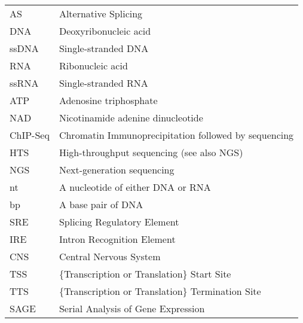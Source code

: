 \documentclass[12pt, letter, oneside]{Thesis} %
\begin{document}
\pagestyle{fancy} 
	\tableofcontents %
	\listoffigures %
	\listoftables %
\clearpage %
	\listAbreviations
\label{hd:abrevs}
\begin{table}[h]
\begin{tabular}{ll}
AS       & Alternative Splicing                                 \\
DNA      & Deoxyribonucleic acid                                \\
ssDNA    & Single-stranded DNA                                  \\
RNA      & Ribonucleic acid                                     \\
ssRNA    & Single-stranded RNA                                  \\
ATP      & Adenosine triphosphate                               \\
NAD      & Nicotinamide adenine dinucleotide                    \\
ChIP-Seq & Chromatin Immunoprecipitation followed by sequencing \\
HTS      & High-throughput sequencing (see also NGS)            \\
NGS      & Next-generation sequencing                           \\
nt       & A nucleotide of either DNA or RNA                    \\
bp       & A base pair of DNA                                   \\
SRE      & Splicing Regulatory Element                          \\
IRE      & Intron Recognition Element                           \\
CNS      & Central Nervous System                               \\
TSS      & \{Transcription or Translation\} Start Site          \\
TTS      & \{Transcription or Translation\} Termination Site    \\
SAGE     & Serial Analysis of Gene Expression                   \\
\end{tabular}
\end{table}
\clearpage %
\end{document}
